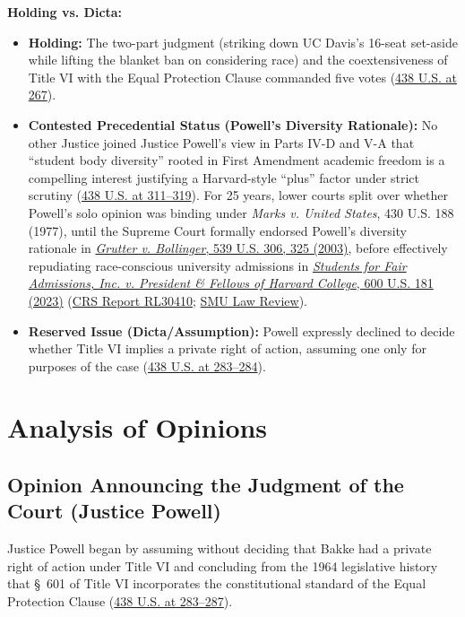 \documentclass[12pt]{article}
\begin{document}
\textbf{Holding vs. Dicta:}
\begin{itemize}
\item \textbf{Holding:} The two-part judgment (striking down UC Davis's 16-seat set-aside while lifting the blanket ban on considering race) and the coextensiveness of Title VI with the Equal Protection Clause commanded five votes (\href{https://supreme.justia.com/cases/federal/us/438/265/}{438 U.S. at 267}).
\item \textbf{Contested Precedential Status (Powell's Diversity Rationale):} No other Justice joined Justice Powell's view in Parts IV-D and V-A that ``student body diversity'' rooted in First Amendment academic freedom is a compelling interest justifying a Harvard-style ``plus'' factor under strict scrutiny (\href{https://supreme.justia.com/cases/federal/us/438/265/}{438 U.S. at 311--319}). For 25 years, lower courts split over whether Powell's solo opinion was binding under \textit{Marks v. United States}, 430 U.S. 188 (1977), until the Supreme Court formally endorsed Powell's diversity rationale in \href{https://en.wikipedia.org/wiki/Grutter_v._Bollinger}{\textit{Grutter v. Bollinger}, 539 U.S. 306, 325 (2003)}, before effectively repudiating race-conscious university admissions in \href{https://en.wikipedia.org/wiki/Students_for_Fair_Admissions_v._Harvard}{\textit{Students for Fair Admissions, Inc. v. President \& Fellows of Harvard College}, 600 U.S. 181 (2023)} (\href{https://www.everycrsreport.com/reports/RL30410.html}{CRS Report RL30410}; \href{https://scholar.smu.edu/context/smulr/article/4985/viewcontent/The_Post_Racial_Deception_of_the_Roberts_Court.pdf}{SMU Law Review}).
\item \textbf{Reserved Issue (Dicta/Assumption):} Powell expressly declined to decide whether Title VI implies a private right of action, assuming one only for purposes of the case (\href{https://supreme.justia.com/cases/federal/us/438/265/}{438 U.S. at 283--284}).
\end{itemize}

\section{Analysis of Opinions}
\subsection{Opinion Announcing the Judgment of the Court (Justice Powell)}
Justice Powell began by assuming without deciding that Bakke had a private right of action under Title VI and concluding from the 1964 legislative history that \S~601 of Title VI incorporates the constitutional standard of the Equal Protection Clause (\href{https://supreme.justia.com/cases/federal/us/438/265/}{438 U.S. at 283--287}).
\end{document}
